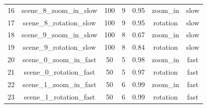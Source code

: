 \begin{table}
\begin{tabular}{|c|c|c|c|c|c|c|}
16 & scene\_8\_zoom\_in\_slow & 100                                                      & 9                                                         & 0.95                                                         & zoom\_in                                                    & slow     \\
17 & scene\_8\_rotation\_slow & 100                                                      & 9                                                         & 0.95                                                         & rotation                                                    & slow     \\
18 & scene\_9\_zoom\_in\_slow & 100                                                      & 8                                                         & 0.67                                                         & zoom\_in                                                    & slow     \\
19 & scene\_9\_rotation\_slow & 100                                                      & 8                                                         & 0.84                                                         & rotation                                                    & slow     \\
20 & scene\_0\_zoom\_in\_fast & 50                                                       & 5                                                         & 0.98                                                         & zoom\_in                                                    & fast     \\
21 & scene\_0\_rotation\_fast & 50                                                       & 5                                                         & 0.97                                                         & rotation                                                    & fast     \\
22 & scene\_1\_zoom\_in\_fast & 50                                                       & 6                                                         & 0.99                                                         & zoom\_in                                                    & fast     \\
23 & scene\_1\_rotation\_fast & 50                                                       & 6                                                         & 0.99                                                         & rotation                                                    & fast     \\

\end{tabular}
\end{table}
